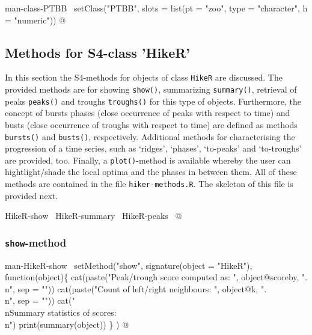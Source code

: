 \documentclass[a4paper]{article}
\begin{document}
\LA{}man-class-PTBB~{\nwtagstyle{}}\RA{}
setClass("PTBB", slots = list(pt = "zoo",
                              type = "character",
                              h = "numeric"))
\nwendcode{}@

\subsection{Methods for S4-class 'HikeR'}

In this section the S4-methods for objects of class \verb?HikeR? are
discussed. The provided methods are for showing \verb?show()?,
summarizing \verb?summary()?, retrieval of peaks \verb?peaks()? and troughs
\verb?troughs()? for this type of objects. Furthermore, the concept of
bursts phases (close occurrence of peaks with respect to time) and
busts (close occurrence of troughs with respect to time) are defined
as methods \verb?bursts()? and \verb?busts()?, respectively. Additional
methods for characterising the progression of a time series, such as
`ridges', `phases', `to-peaks' and `to-troughs' are provided,
too. Finally, a \verb?plot()?-method is available whereby the user can
hightlight/shade the local optima and the phases in between them. All
of these methods are contained in the file \verb?hiker-methods.R?. The
skeleton of this file is provided next.

\nwenddocs{}\endmoddef\let\nwnotused=\nwoutput{}
\LA{}HikeR-show~{\nwtagstyle{}}\RA{}
\LA{}HikeR-summary~{\nwtagstyle{}}\RA{}
\LA{}HikeR-peaks~{\nwtagstyle{}}\RA{}
\nwnotused{HikerMethods.R}\nwendcode{}@


\subsubsection{\texttt{show}-method}

\nwenddocs{}\endmoddef
\LA{}man-HikeR-show~{\nwtagstyle{}}\RA{}
setMethod("show",
          signature(object = "HikeR"), function(object)\{
              cat(paste("Peak/trough score computed as: ",
                        object@scoreby, ".\\n", sep = ""))
              cat(paste("Count of left/right neighbours: ", object@k,
                        ".\\n", sep = ""))
              cat("\\nSummary statistics of scores:\\n")
              print(summary(object))
          \}
)
\nwendcode{}@
\end{document}
